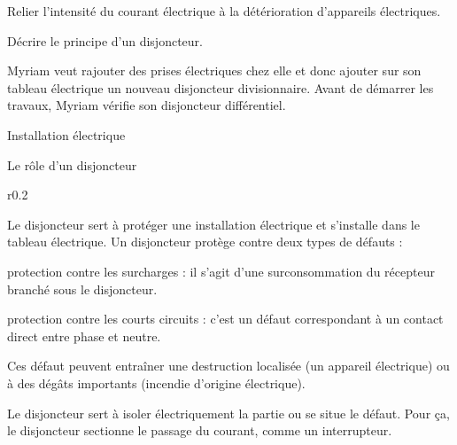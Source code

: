 \tetePremStssElec
\vspace*{-36pt}

\begin{objectifs}
  \item Relier l'intensité du courant électrique à la détérioration d'appareils électriques.
  \item Décrire le principe d'un disjoncteur.
\end{objectifs}



\begin{contexte}  
  Myriam veut rajouter des prises électriques chez elle et donc ajouter sur son tableau électrique un nouveau disjoncteur divisionnaire.
  Avant de démarrer les travaux, Myriam vérifie son disjoncteur différentiel.

\end{contexte}

\begin{doc}{Installation électrique}
  \begin{center}
  \end{center}
\end{doc}

\begin{doc}{Le rôle d'un disjoncteur}
  \begin{wrapfigure}[8]{r}{0.2\linewidth}
    \vspace*{-24pt}
    \centering
  \end{wrapfigure}
  Le disjoncteur sert à protéger une installation électrique et s'installe dans le tableau électrique.
  Un disjoncteur protège contre deux types de défauts :
  \begin{listePoints}
    \item protection contre les surcharges : il s'agit d'une surconsommation du récepteur branché sous le disjoncteur.
    \item protection contre les courts circuits : c'est un défaut correspondant à un contact direct entre phase et neutre.
  \end{listePoints}
  Ces défaut peuvent entraîner une destruction localisée (un appareil électrique) ou à des dégâts importants (incendie d'origine électrique).
  
  Le disjoncteur sert à isoler électriquement la partie ou se situe le défaut.
  Pour ça, le disjoncteur sectionne le passage du courant, comme un interrupteur.
\end{doc}

